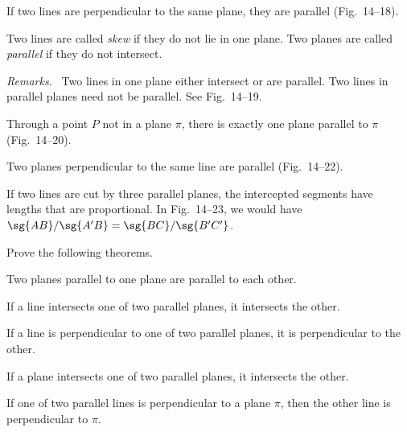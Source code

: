 \documentclass[11pt]{book}
\theoremstyle{bkplain}
\theoremstyle{XIplainnote}
\theoremstyle{bkplain}
\newenvironment{XIVremarks}{\par\medskip\noindent\emph{Remarks.}\ }%
  {\par\medskip}
\theoremstyle{bkplain}
\begin{document}
\begin{theorem}
If two lines are perpendicular to the same plane, they are parallel
(Fig.~14--18).
\end{theorem}


\FIGXIVSEVENTEENEIGHTEEN

\begin{definition}
Two lines are called \emph{skew} if they do not lie in one plane. Two planes are
called \emph{parallel} if they do not intersect.
\end{definition}

\begin{XIVremarks}
Two lines in one plane either intersect or are parallel. Two lines in parallel
planes need not be parallel. See Fig.~14--19.
\end{XIVremarks}

\FIGXIVNINETEEN

\begin{theorem}
Through a point $P$ not in a plane $\pi$, there is exactly one plane parallel to
$\pi$ (Fig.~14--20).
\end{theorem}


\begin{theorem}
Two planes perpendicular to the same line are parallel (Fig.~14--22).
\end{theorem}

\FIGXIVTWENTYTWENTYTWO

\begin{theorem}
If two lines are cut by three parallel planes, the intercepted segments have
lengths that are proportional. In Fig.~14--23, we would have
$\sg{AB}/\sg{A'B} = \sg{BC}/\sg{B'C'}$.
\end{theorem}

\FIGXIVTWENTYTHREE

Prove the following theorems.
\begin{exercisecols}
\begin{exlist}
\item Two planes parallel to one plane are parallel to each other.
\item If a line intersects one of two parallel planes, it intersects the other.
\item If a line is perpendicular to one of two parallel planes, it is
      perpendicular to the other.
\item If a plane intersects one of two parallel planes, it intersects the other.
\item If one of two parallel lines is perpendicular to a plane $\pi$, then the
      other line is perpendicular to $\pi$.
\end{exlist}
\end{exercisecols}
\end{document}
